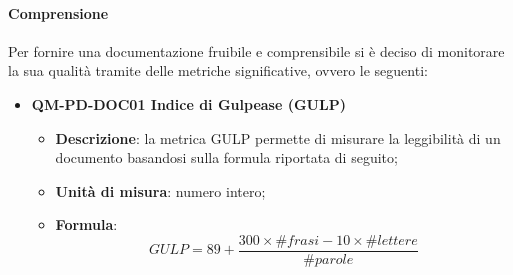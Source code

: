 			\paragraph{Comprensione}
				Per fornire una documentazione fruibile e comprensibile si è deciso di monitorare la sua qualità tramite delle metriche significative, ovvero le seguenti:\\
				\begin{itemize}
					\item\textbf{QM-PD-DOC01 Indice di Gulpease (GULP)}
						\begin{itemize}
							\item\textbf{Descrizione}: la metrica GULP permette di misurare la leggibilità di un documento basandosi sulla formula riportata di seguito;
							\item\textbf{Unità di misura}: numero intero;
							\item\textbf{Formula}: \\
								\[GULP = 89+ \frac{300\times\#\mathit{frasi} -10\times\#lettere}{\#parole}\]
								

\end{itemize}
\end{itemize}
